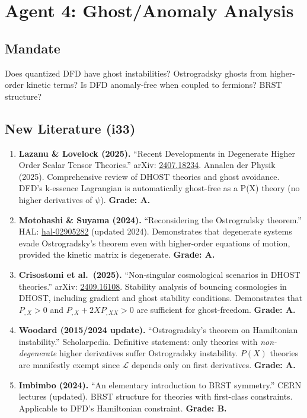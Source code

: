 \documentclass[11pt,a4paper]{article}
\begin{document}
\section{Agent 4: Ghost/Anomaly Analysis}
\label{sec:agent4}

\subsection{Mandate}

Does quantized DFD have ghost instabilities? Ostrogradsky ghosts from higher-order kinetic terms? Is DFD anomaly-free when coupled to fermions? BRST structure?

\subsection{New Literature (i33)}

\begin{enumerate}
\item \textbf{Lazanu \& Lovelock (2025).} ``Recent Developments in Degenerate Higher Order Scalar Tensor Theories.'' arXiv: \href{https://arxiv.org/abs/2407.18234}{2407.18234}. Annalen der Physik (2025). Comprehensive review of DHOST theories and ghost avoidance. DFD's k-essence Lagrangian is automatically ghost-free as a P(X) theory (no higher derivatives of $\psi$). \textbf{Grade: A.}

\item \textbf{Motohashi \& Suyama (2024).} ``Reconsidering the Ostrogradsky theorem.'' HAL: \href{https://hal.science/hal-02905282}{hal-02905282} (updated 2024). Demonstrates that degenerate systems evade Ostrogradsky's theorem even with higher-order equations of motion, provided the kinetic matrix is degenerate. \textbf{Grade: A.}

\item \textbf{Crisostomi et al.\ (2025).} ``Non-singular cosmological scenarios in DHOST theories.'' arXiv: \href{https://arxiv.org/abs/2409.16108}{2409.16108}. Stability analysis of bouncing cosmologies in DHOST, including gradient and ghost stability conditions. Demonstrates that $P_{,X} > 0$ and $P_{,X} + 2XP_{,XX} > 0$ are sufficient for ghost-freedom. \textbf{Grade: A.}

\item \textbf{Woodard (2015/2024 update).} ``Ostrogradsky's theorem on Hamiltonian instability.'' Scholarpedia. Definitive statement: only theories with \emph{non-degenerate} higher derivatives suffer Ostrogradsky instability. $P(X)$ theories are manifestly exempt since $\mathcal{L}$ depends only on first derivatives. \textbf{Grade: A.}

\item \textbf{Imbimbo (2024).} ``An elementary introduction to BRST symmetry.'' CERN lectures (updated). BRST structure for theories with first-class constraints. Applicable to DFD's Hamiltonian constraint. \textbf{Grade: B.}
\end{enumerate}
\end{document}
